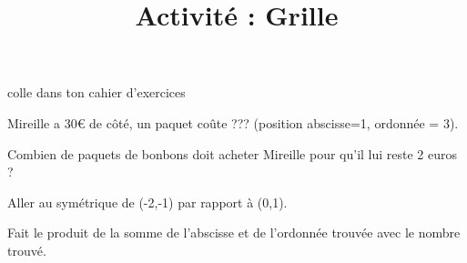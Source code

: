 \documentclass[a4paper,11pt]{article}
\title{Activité : Grille}
\date{}
\author{}
\makeatletter
\renewcommand{\maketitle}{%
{\scriptsize colle dans ton cahier d'exercices}
	\begin{center}
		\LARGE
		\myuline{\@title}
		\vspace{0.5em}
	\end{center}
}
\makeatother
\begin{document}
\maketitle


\begin{exercice}
	Mireille a 30€ de côté, un paquet coûte ??? (position abscisse=1, ordonnée = 3).

	Combien de paquets de bonbons doit acheter Mireille pour qu'il lui reste 2 euros ?

\end{exercice}

\begin{exercice}
	Aller au symétrique de (-2,-1) par rapport à (0,1).


	Fait le produit de la somme de l'abscisse et de l'ordonnée trouvée avec le nombre trouvé.
\end{exercice}

\begin{exercice}
	
\end{exercice}
\end{document}
